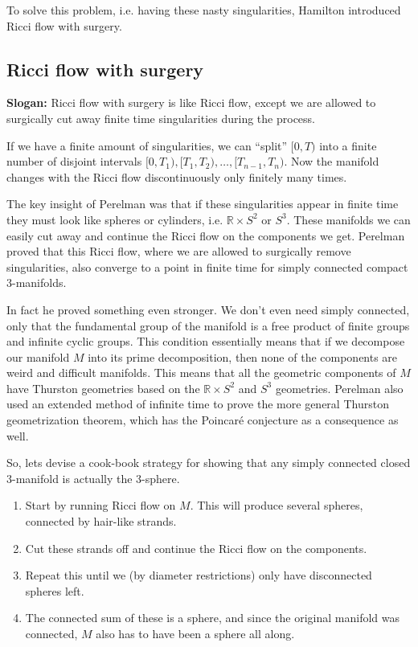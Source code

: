 To solve this problem, i.e. having these nasty singularities, Hamilton introduced Ricci flow with surgery. 


\subsection{Ricci flow with surgery}

\textbf{Slogan:} Ricci flow with surgery is like Ricci flow, except we are allowed to surgically cut away finite time singularities during the process. 

If we have a finite amount of singularities, we can ``split'' $[0, T)$ into a finite number of disjoint intervals $[0, T_1), [T_1, T_2), \ldots, [T_{n-1}, T_n)$. 
Now the manifold changes with the Ricci flow discontinuously only finitely many times.

The key insight of Perelman was that if these singularities appear in finite time they must look like spheres or cylinders, i.e. $\mathbb{R}\times S^2$ or $S^3.$  
These manifolds we can easily cut away and continue the Ricci flow on the components we get. 
Perelman proved that this Ricci flow, where we are allowed to surgically remove singularities, also converge to a point in finite time for simply connected compact 3-manifolds. 

In fact he proved something even stronger. 
We don't even need simply connected, only that the fundamental group of the manifold is a free product of finite groups and infinite cyclic groups. 
This condition essentially means that if we decompose our manifold $M$ into its prime decomposition, then none of the components are weird and difficult manifolds. 
This means that all the geometric components of $M$ have Thurston geometries based on the $\mathbb{R}\times S^2$ and $S^3$ geometries. 
Perelman also used an extended method of infinite time to prove the more general Thurston geometrization theorem, which has the Poincaré conjecture as a consequence as well. 

So, lets devise a cook-book strategy for showing that any simply connected closed 3-manifold is actually the 3-sphere. 
\begin{enumerate}
    \item Start by running Ricci flow on $M$. This will produce several spheres, connected by hair-like strands. 
    \item Cut these strands off and continue the Ricci flow on the components. 
    \item Repeat this until we (by diameter restrictions) only have disconnected spheres left. 
    \item The connected sum of these is a sphere, and since the original manifold was connected, $M$ also has to have been a sphere all along.  
\end{enumerate}


